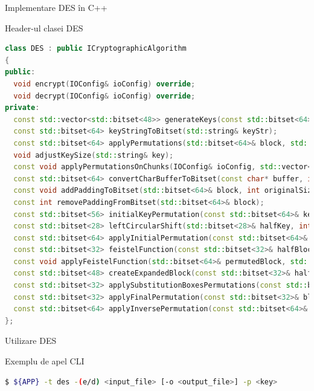 \documentclass{beamer}
\begin{document}
\begin{frame}[fragile]{Implementare DES în C++}
  \begin{block}{Header-ul clasei DES}
    \begin{lstlisting}[language=C++]
class DES : public ICryptographicAlgorithm
{
public:
  void encrypt(IOConfig& ioConfig) override;
  void decrypt(IOConfig& ioConfig) override;
private:
  const std::vector<std::bitset<48>> generateKeys(const std::bitset<64>& key);
  const std::bitset<64> keyStringToBitset(std::string& keyStr);
  const std::bitset<64> applyPermutations(std::bitset<64>& block, std::vector<std::bitset<48>>& subKeys);
  void adjustKeySize(std::string& key);
  const void applyPermutationsOnChunks(IOConfig& ioConfig, std::vector<std::bitset<48>>& subKeys);
  const std::bitset<64> convertCharBufferToBitset(const char* buffer, int bufferSize);
  const void addPaddingToBitset(std::bitset<64>& block, int originalSize);
  const int removePaddingFromBitset(std::bitset<64>& block);
  const std::bitset<56> initialKeyPermutation(const std::bitset<64>& key);
  const std::bitset<28> leftCircularShift(std::bitset<28>& halfKey, int shifts);
  const std::bitset<64> applyInitialPermutation(const std::bitset<64>& block);
  const std::bitset<32> feistelFunction(const std::bitset<32>& halfBlock, const std::bitset<48>& key);
  const void applyFeistelFunction(std::bitset<64>& permutedBlock, std::vector<std::bitset<48>>& subKeys);
  const std::bitset<48> createExpandedBlock(const std::bitset<32>& halfBlock);
  const std::bitset<32> applySubstitutionBoxesPermutations(const std::bitset<48>& xored);
  const std::bitset<32> applyFinalPermutation(const std::bitset<32>& block);
  const std::bitset<64> applyInversePermutation(const std::bitset<64>& permutedBlock);
};
    \end{lstlisting}
  \end{block}
\end{frame}

\begin{frame}[fragile]{Utilizare DES}
  \begin{block}{Exemplu de apel CLI}
    \begin{lstlisting}[language=bash]
$ ${APP} -t des -(e/d) <input_file> [-o <output_file>] -p <key>
    \end{lstlisting}
  \end{block}
\end{frame}
\end{document}
